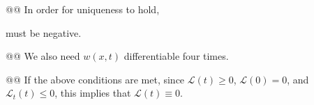 \documentclass[10pt]{article}
\begin{document}
\begin{easylist}[enumerate]
    @@ In order for uniqueness to hold, 


    must be negative.

    @@ We also need $w(x, t)$ differentiable four times.

    @@ If the above conditions are met, since $\mathcal{L}(t) \ge 0$, $\mathcal{L}(0) = 0$, and $\mathcal{L}_t(t) \le
    0$, this implies that $\mathcal{L}(t) \equiv 0$.
\end{easylist}
\end{document}
